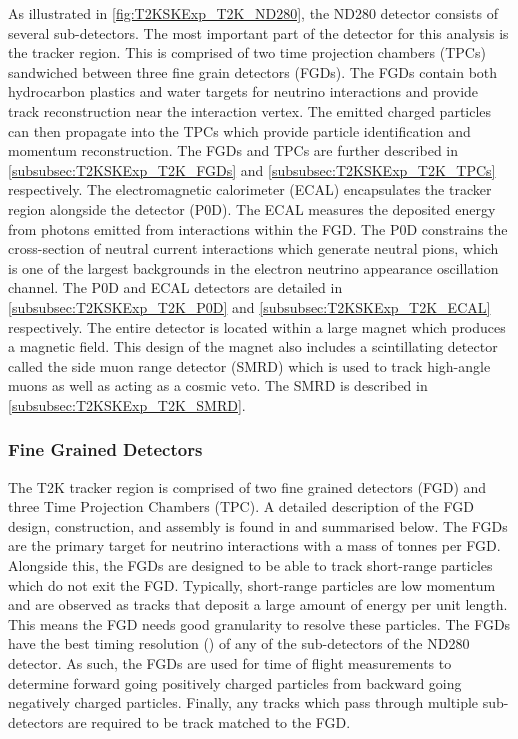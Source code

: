 As illustrated in \autoref{fig:T2KSKExp_T2K_ND280}, the ND280 detector consists of several sub-detectors. The most important part of the detector for this analysis is the tracker region. This is comprised of two time projection chambers (TPCs) sandwiched between three fine grain detectors (FGDs). The FGDs contain both hydrocarbon plastics and water targets for neutrino interactions and provide track reconstruction near the interaction vertex. The emitted charged particles can then propagate into the TPCs which provide particle identification and momentum reconstruction. The FGDs and TPCs are further described in \autoref{subsubsec:T2KSKExp_T2K_FGDs} and \autoref{subsubsec:T2KSKExp_T2K_TPCs} respectively. The electromagnetic calorimeter (ECAL) encapsulates the tracker region alongside the  detector (P0D). The ECAL measures the deposited energy from photons emitted from interactions within the FGD. The P0D constrains the cross-section of neutral current interactions which generate neutral pions, which is one of the largest backgrounds in the electron neutrino appearance oscillation channel. The P0D and ECAL detectors are detailed in \autoref{subsubsec:T2KSKExp_T2K_P0D} and \autoref{subsubsec:T2KSKExp_T2K_ECAL} respectively. The entire detector is located within a large   magnet which produces a  magnetic field. This design of the magnet also includes a scintillating detector called the side muon range detector (SMRD) which is used to track high-angle muons as well as acting as a cosmic veto. The SMRD is described in \autoref{subsubsec:T2KSKExp_T2K_SMRD}.  

\subsubsection{Fine Grained Detectors}
\label{subsubsec:T2KSKExp_T2K_FGDs}

The T2K tracker region is comprised of two fine grained detectors (FGD) and three Time Projection Chambers (TPC). A detailed description of the FGD design, construction, and assembly is found in \cite{Amaudruz2012} and summarised below. The FGDs are the primary target for neutrino interactions with a mass of  tonnes per FGD.
Alongside this, the FGDs are designed to be able to track short-range particles which do not exit the FGD. Typically, short-range particles are low momentum and are observed as tracks that deposit a large amount of energy per unit length. This means the FGD needs good granularity to resolve these particles. The FGDs have the best timing resolution () of any of the sub-detectors of the ND280 detector. As such, the FGDs are used for time of flight measurements to determine forward going positively charged particles from backward going negatively charged particles. Finally, any tracks which pass through multiple sub-detectors are required to be track matched to the FGD.

